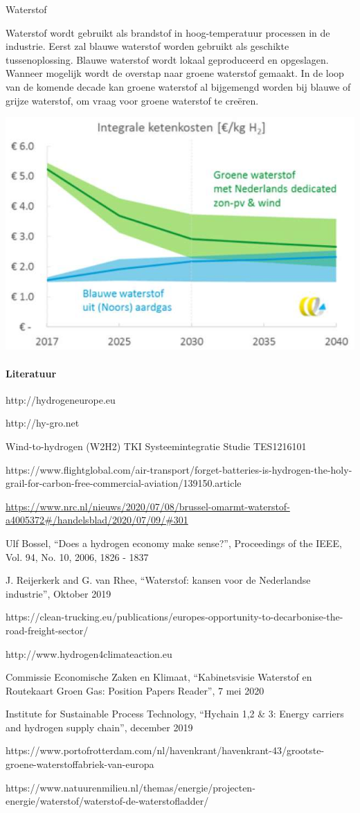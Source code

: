 \begin{voorstel}{Waterstof}
\begin{aanbevelingen}
Waterstof wordt gebruikt als brandstof in hoog-temperatuur processen in de industrie. Eerst zal blauwe waterstof worden gebruikt als geschikte tussenoplossing. Blauwe waterstof wordt lokaal geproduceerd en opgeslagen. Wanneer mogelijk wordt de overstap naar groene waterstof gemaakt. In de loop van de komende decade kan groene waterstof al bijgemengd worden bij blauwe of grijze waterstof, om vraag voor groene waterstof te creëren.

\includegraphics[width=.5\textwidth]{img/energie/waterstof-ketenkosten}

\end{aanbevelingen}

\paragraph{Literatuur}
http://hydrogeneurope.eu

http://hy-gro.net

Wind-to-hydrogen (W2H2) TKI Systeemintegratie Studie TES1216101

https://www.flightglobal.com/air-transport/forget-batteries-is-hydrogen-the-holy-grail-for-carbon-free-commercial-aviation/139150.article

\url{https://www.nrc.nl/nieuws/2020/07/08/brussel-omarmt-waterstof-a4005372#/handelsblad/2020/07/09/#301}

Ulf Bossel, “Does a hydrogen economy make sense?”, Proceedings of the IEEE, Vol. 94, No. 10, 2006, 1826 - 1837

J. Reijerkerk and G. van Rhee, “Waterstof: kansen voor de Nederlandse industrie”, Oktober 2019

https://clean-trucking.eu/publications/europes-opportunity-to-decarbonise-the-road-freight-sector/

http://www.hydrogen4climateaction.eu

Commissie Economische Zaken en Klimaat, “Kabinetsvisie Waterstof en Routekaart Groen Gas: Position Papers Reader”, 7 mei 2020

Institute for Sustainable Process Technology, “Hychain 1,2 \& 3: Energy carriers and hydrogen supply chain”, december 2019

https://www.portofrotterdam.com/nl/havenkrant/havenkrant-43/grootste-groene-waterstoffabriek-van-europa

https://www.natuurenmilieu.nl/themas/energie/projecten-energie/waterstof/waterstof-de-waterstofladder/


\end{voorstel}
